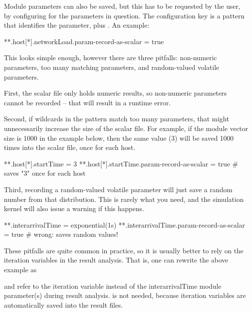 Module parameters can also be saved, but this has to be
requested by the user, by configuring  for the
parameters in question. The configuration key is a pattern that
identifies the parameter, plus . An example:

\begin{inifile}
**.host[*].networkLoad.param-record-as-scalar = true
\end{inifile}

This looks simple enough, however there are three pitfalls:
non-numeric parameters, too many matching parameters, and
random-valued volatile parameters.

First, the scalar file only holds numeric results, so non-numeric
parameters cannot be recorded -- that will result in a runtime
error.

Second, if wildcards in the pattern match too many parameters, that
might unnecessarily increase the size of the scalar file. For example,
if the  module vector size is 1000 in the example below, then the
same value (3) will be saved 1000 times into the scalar file, once for
each host.

\begin{inifile}
**.host[*].startTime = 3
**.host[*].startTime.param-record-as-scalar = true  # saves "3" once for each host
\end{inifile}

Third, recording a random-valued volatile parameter will just save a
random number from that distribution. This is rarely what you need, and
the simulation kernel will also issue a warning if this happens.

\begin{inifile}
**.interarrivalTime = exponential(1s)
**.interarrivalTime.param-record-as-scalar = true  # wrong: saves random values!
\end{inifile}

These pitfalls are quite common in practice, so it is usually better
to rely on the iteration variables in the result analysis.
That is, one can rewrite the above example as


and refer to the  iteration variable instead of the
interarrivalTime module parameter(s) during result analysis.
 is not needed, because iteration variables are
automatically saved into the result files.


